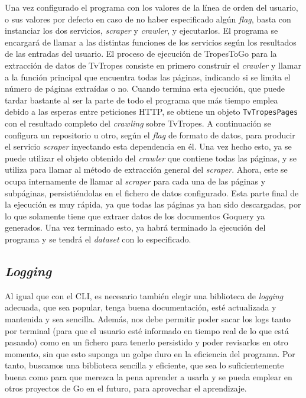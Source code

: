Una vez configurado el programa con los valores de la línea de orden del
usuario, o sus valores por defecto en caso de no haber especificado algún
\textit{flag}, basta con instanciar los dos servicios, \textit{scraper} y
\textit{crawler}, y ejecutarlos. El programa se encargará de llamar a las
distintas funciones de los servicios según los resultados de las entradas del
usuario. El proceso de ejecución de TropesToGo para la extracción de datos de
TvTropes consiste en primero construir el \textit{crawler} y llamar a la función
principal que encuentra todas las páginas, indicando si se limita el número de
páginas extraídas o no. Cuando termina esta ejecución, que puede tardar bastante
al ser la parte de todo el programa que más tiempo emplea debido a las esperas
entre peticiones HTTP, se obtiene un objeto \texttt{TvTropesPages} con el
resultado completo del \textit{crawling} sobre TvTropes. A continuación se
configura un repositorio u otro, según el \textit{flag} de formato de datos,
para producir el servicio \textit{scraper} inyectando esta dependencia en él.
Una vez hecho esto, ya se puede utilizar el objeto obtenido del \textit{crawler}
que contiene todas las páginas, y se utiliza para llamar al método de extracción
general del \textit{scraper}. Ahora, este se ocupa internamente de llamar al
\textit{scraper} para cada una de las páginas y subpáginas, persistiéndolas en
el fichero de datos configurado. Esta parte final de la ejecución es muy rápida,
ya que todas las páginas ya han sido descargadas, por lo que solamente tiene que
extraer datos de los documentos Goquery ya generados. Una vez terminado esto, ya
habrá terminado la ejecución del programa y se tendrá el \textit{dataset} con lo
especificado.

\subsection{\textit{Logging}}
Al igual que con el CLI, es necesario también elegir una biblioteca de
\textit{logging} adecuada, que sea popular, tenga buena documentación, esté
actualizada y mantenida y sea sencilla. Además, nos debe permitir
poder sacar los logs tanto por terminal (para que el usuario esté informado en
tiempo real de lo que está pasando) como en un fichero para tenerlo persistido y
poder revisarlos en otro momento, sin que esto suponga un golpe duro en la
eficiencia del programa. Por tanto, buscamos una biblioteca sencilla y
eficiente, que sea lo suficientemente buena como para que merezca la pena
aprender a usarla y se pueda emplear en otros proyectos de Go en el futuro, para
aprovechar el aprendizaje.

